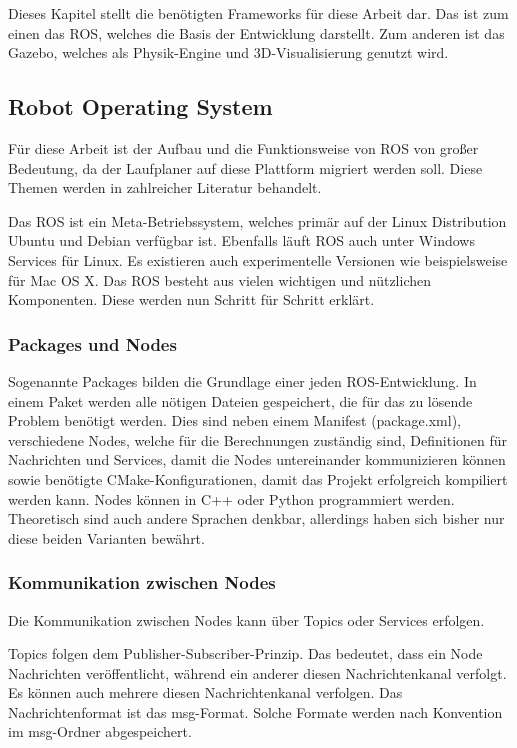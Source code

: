 Dieses Kapitel stellt die benötigten Frameworks für diese Arbeit dar. Das ist zum einen das \ac{ROS}, welches die Basis der Entwicklung darstellt. Zum anderen ist das Gazebo, welches als Physik-Engine und 3D-Visualisierung genutzt wird.

\subsection{Robot Operating System}

Für diese Arbeit ist der Aufbau und die Funktionsweise von \ac{ROS} von großer Bedeutung, da der Laufplaner auf diese Plattform migriert werden soll. Diese Themen werden in zahlreicher Literatur behandelt. \autocite{rosAnOpenSourceRobotOperatingSystem} \autocite{learningROSForRoboticsProgramming} \autocite{gentleIntroductionToROS}

Das \ac{ROS} ist ein Meta-Betriebssystem, welches primär auf der Linux Distribution Ubuntu und Debian verfügbar ist. Ebenfalls läuft \ac{ROS} auch unter Windows Services für Linux. Es existieren auch experimentelle Versionen wie beispielsweise für Mac OS X. Das \ac{ROS} besteht aus vielen wichtigen und nützlichen Komponenten. Diese werden nun Schritt für Schritt erklärt.

\subsubsection{Packages und Nodes}

Sogenannte Packages bilden die Grundlage einer jeden \ac{ROS}-Entwicklung. In einem Paket werden alle nötigen Dateien gespeichert, die für das zu lösende Problem benötigt werden. Dies sind neben einem Manifest (package.xml), verschiedene Nodes, welche für die Berechnungen zuständig sind, Definitionen für Nachrichten und Services, damit die Nodes untereinander kommunizieren können sowie benötigte CMake-Konfigurationen, damit das Projekt erfolgreich kompiliert werden kann. Nodes können in C++ oder Python programmiert werden. Theoretisch sind auch andere Sprachen denkbar, allerdings haben sich bisher nur diese beiden Varianten bewährt.

\subsubsection{Kommunikation zwischen Nodes}

Die Kommunikation zwischen Nodes kann über Topics oder Services erfolgen.

Topics folgen dem Publisher-Subscriber-Prinzip. Das bedeutet, dass ein Node Nachrichten veröffentlicht, während ein anderer diesen Nachrichtenkanal verfolgt. Es können auch mehrere diesen Nachrichtenkanal verfolgen. Das Nachrichtenformat ist das msg-Format. Solche Formate werden nach Konvention im msg-Ordner abgespeichert.

